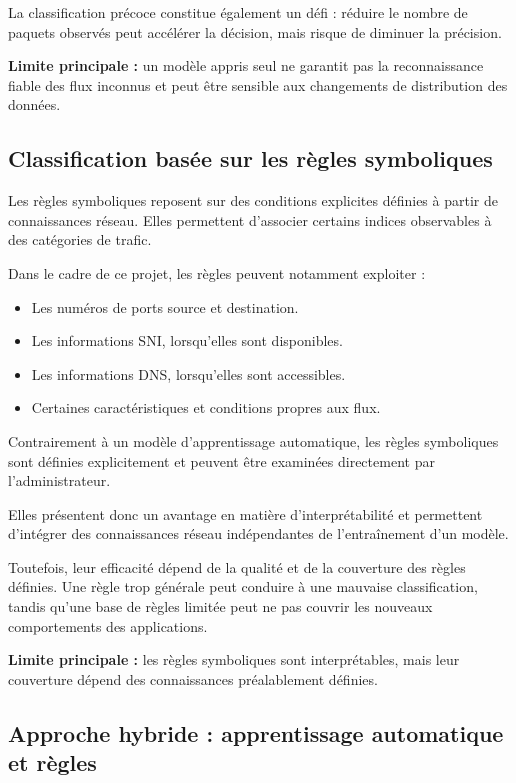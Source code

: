 La classification précoce constitue également un défi : réduire
le nombre de paquets observés peut accélérer la décision, mais
risque de diminuer la précision.

\textbf{Limite principale :} un modèle appris seul ne garantit pas
la reconnaissance fiable des flux inconnus et peut être sensible
aux changements de distribution des données.

\subsection{Classification basée sur les règles symboliques}

Les règles symboliques reposent sur des conditions explicites
définies à partir de connaissances réseau. Elles permettent
d'associer certains indices observables à des catégories de trafic.

Dans le cadre de ce projet, les règles peuvent notamment exploiter :

\begin{itemize}
    \item Les numéros de ports source et destination.
    \item Les informations SNI, lorsqu'elles sont disponibles.
    \item Les informations DNS, lorsqu'elles sont accessibles.
    \item Certaines caractéristiques et conditions propres aux flux.
\end{itemize}

Contrairement à un modèle d'apprentissage automatique, les règles
symboliques sont définies explicitement et peuvent être examinées
directement par l'administrateur.

Elles présentent donc un avantage en matière d'interprétabilité
et permettent d'intégrer des connaissances réseau indépendantes
de l'entraînement d'un modèle.

Toutefois, leur efficacité dépend de la qualité et de la couverture
des règles définies. Une règle trop générale peut conduire à une
mauvaise classification, tandis qu'une base de règles limitée
peut ne pas couvrir les nouveaux comportements des applications.

\textbf{Limite principale :} les règles symboliques sont
interprétables, mais leur couverture dépend des connaissances
préalablement définies.

\subsection{Approche hybride : apprentissage automatique et règles}

